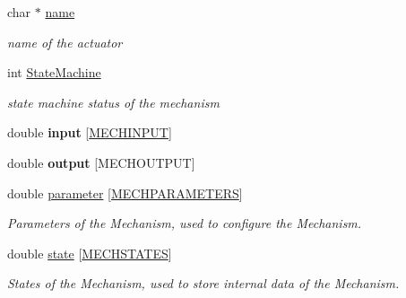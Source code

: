 \begin{DoxyCompactItemize}
\item 
\mbox{\label{struct_mechanism___ab385a347f349de5cc29ccb33449aede0}} 
char $\ast$ \hyperlink{struct_mechanism___ab385a347f349de5cc29ccb33449aede0}{name}
\begin{DoxyCompactList}\small\item\em name of the actuator \end{DoxyCompactList}\item 
\mbox{\label{struct_mechanism___a26ce038ef9b8ac0083a4f6c2c44397cf}} 
int \hyperlink{struct_mechanism___a26ce038ef9b8ac0083a4f6c2c44397cf}{State\+Machine}
\begin{DoxyCompactList}\small\item\em state machine status of the mechanism \end{DoxyCompactList}\item 
\mbox{\label{struct_mechanism___a53fa657ea7cb16e8db924988a9da9870}} 
double {\bfseries input} \mbox{[}\hyperlink{_mechanism_8h_abb111d77b10e0fef53b6391bef62a824}{M\+E\+C\+H\+I\+N\+P\+UT}\mbox{]}
\item 
\mbox{\label{struct_mechanism___a98a865ba4a9ceab5899b99a85599bbeb}} 
double {\bfseries output} \mbox{[}M\+E\+C\+H\+O\+U\+T\+P\+UT\mbox{]}
\item 
\mbox{\label{struct_mechanism___a073ccbb495cd69c3a81b7b1a12a43259}} 
double \hyperlink{struct_mechanism___a073ccbb495cd69c3a81b7b1a12a43259}{parameter} \mbox{[}\hyperlink{_mechanism_8h_a94f70e12521cf4dbbb63b8996e2bda3b}{M\+E\+C\+H\+P\+A\+R\+A\+M\+E\+T\+E\+RS}\mbox{]}
\begin{DoxyCompactList}\small\item\em Parameters of the Mechanism, used to configure the Mechanism. \end{DoxyCompactList}\item 
\mbox{\label{struct_mechanism___a41dcb0c7ca1880e7bdb84d4116a384ec}} 
double \hyperlink{struct_mechanism___a41dcb0c7ca1880e7bdb84d4116a384ec}{state} \mbox{[}\hyperlink{_mechanism_8h_affe80c064d15f5b0187bd5ff3b356f91}{M\+E\+C\+H\+S\+T\+A\+T\+ES}\mbox{]}
\begin{DoxyCompactList}\small\item\em States of the Mechanism, used to store internal data of the Mechanism. \end{DoxyCompactList}\item 

\end{DoxyCompactItemize}
